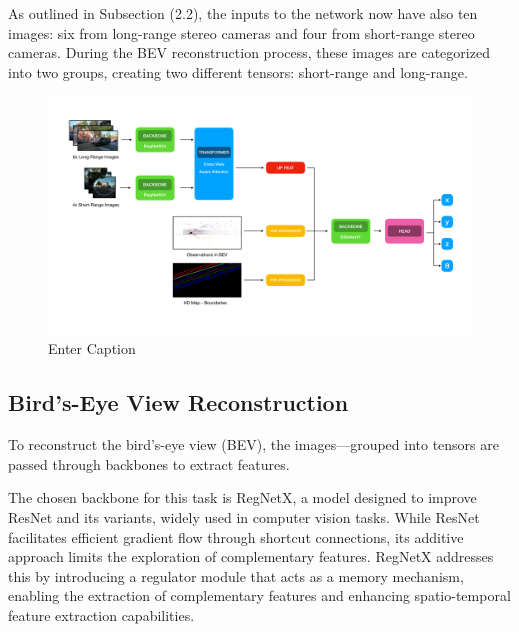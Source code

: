 As outlined in Subsection (2.2), the inputs to the network now have also ten images: six from long-range stereo cameras and four from short-range stereo cameras. During the BEV reconstruction process, these images are categorized into two groups, creating two different tensors: short-range and long-range.
\begin{figure}[H]
    \centering
    \includegraphics[width=1\linewidth]{LateX//figs/model2.pdf}
    \caption{Enter Caption}
    \label{fig:enter-label}
\end{figure}

\subsection*{Bird’s-Eye View Reconstruction}
To reconstruct the bird’s-eye view (BEV), the images—grouped into tensors are passed through backbones to extract features. 

The chosen backbone for this task is RegNetX, a model designed to improve ResNet and its variants, widely used in computer vision tasks. While ResNet facilitates efficient gradient flow through shortcut connections, its additive approach limits the exploration of complementary features. RegNetX addresses this by introducing a regulator module that acts as a memory mechanism, enabling the extraction of complementary features and enhancing spatio-temporal feature extraction capabilities.


